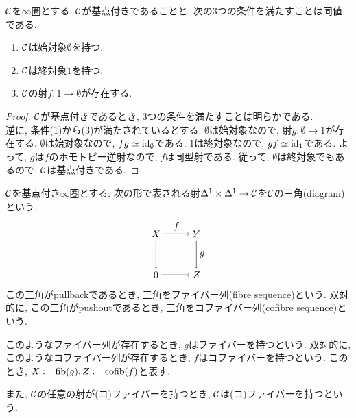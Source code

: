 \documentclass[uplatex, a4paper, 14Q, dvipdfmx]{jsarticle}
\begin{document}
\begin{lemma}
  $\mathcal{C}$を$\infty$圏とする.
  $\mathcal{C}$が基点付きであることと, 次の3つの条件を満たすことは同値である. 
  \begin{enumerate}
    \item $\mathcal{C}$は始対象$\emptyset$を持つ.
    \item $\mathcal{C}$は終対象$1$を持つ. 
    \item $\mathcal{C}$の射$f : 1 \to \emptyset$が存在する. 
  \end{enumerate}
\end{lemma}

\begin{proof}
  $\mathcal{C}$が基点付きであるとき, 3つの条件を満たすことは明らかである. \\
  逆に, 条件(1)から(3)が満たされているとする.
  $\emptyset$は始対象なので, 射$g : \emptyset \to 1$が存在する.
  $\emptyset$は始対象なので, $fg \simeq \mathrm{id}_\emptyset$である.
  $1$は終対象なので, $gf \simeq \mathrm{id}_1$である. 
  よって, $g$は$f$のホモトピー逆射なので, $f$は同型射である.
  従って, $\emptyset$は終対象でもあるので, $\mathcal{C}$は基点付きである. 
\end{proof}

\begin{definition}[(コ)ファイバー]
  $\mathcal{C}$を基点付き$\infty$圏とする.
  次の形で表される射$\Delta^1 \times \Delta^1 \to \mathcal{C}$を$\mathcal{C}$の三角(diagram)という. 
  \[
    \begin{tikzpicture}[auto,->]
      \node (0) at (0,0) {$0$};
      \node (Z) at (1.5,0) {$Z$};
      \node (X) at (0,1.5) {$X$};
      \node (Y) at (1.5,1.5) {$Y$};
      \draw (0) -- (Z);
      \draw (X) -- (0);
      \draw (X) -- node{$f$} (Y);
      \draw (Y) -- node{$g$} (Z);
    \end{tikzpicture}
  \]
  この三角がpullbackであるとき, 三角をファイバー列(fibre sequence)という.
  双対的に, この三角がpushoutであるとき, 三角をコファイバー列(cofibre sequence)という.

  このようなファイバー列が存在するとき, $g$はファイバーを持つという. 
  双対的に, このようなコファイバー列が存在するとき, $f$はコファイバーを持つという. 
  このとき, $X:=\mathrm{fib}{(g)}, Z := \mathrm{cofib}{(f)}$と表す. 

  また, $\mathcal{C}$の任意の射が(コ)ファイバーを持つとき, $\mathcal{C}$は(コ)ファイバーを持つという. 
\end{definition}
\end{document}
